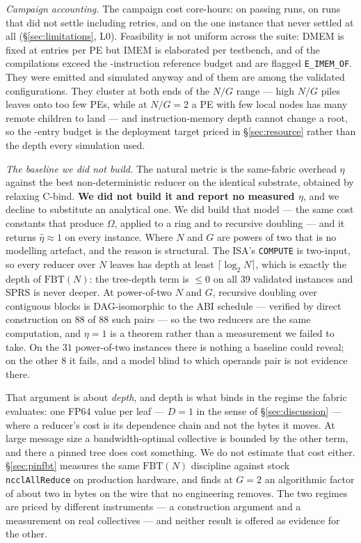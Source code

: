 \documentclass[journal,10pt]{IEEEtran}
\theoremstyle{plain}
\theoremstyle{definition}
\theoremstyle{remark}
\newcommand{\FBT}{\ensuremath{\mathrm{FBT}}}
\newcommand{\sprs}{\textsc{SPRS}}
\newcommand{\sv}[1]{\texttt{#1}}
\begin{document}
\emph{Campaign accounting.} The campaign cost \CampCoreHTotal{} core-hours:
\WallTotalH{} on passing runs, \CampCoreHUnsettled{} on runs that did not
settle including retries, and \MaxpCoreHours{} on the one instance that never
settled at all (\S\ref{sec:limitations}, L0). Feasibility
is not uniform across the suite: DMEM is fixed at \DmemDepth{} entries per PE
but IMEM is elaborated per testbench, and \ImemFlagged{} of the
\CompileTotal{} compilations exceed the \DmemDepth-instruction reference
budget and are flagged \sv{E\_IMEM\_OF}. They were emitted and simulated
anyway and \ImemFlaggedValidated{} of them are among the validated
configurations. They cluster at both ends of the $N/G$ range --- high $N/G$
piles leaves onto too few PEs, while at $N/G = 2$ a PE with few local nodes
has many remote children to land --- and instruction-memory depth cannot
change a root, so the \DmemDepth-entry budget is the deployment target priced
in \S\ref{sec:resource} rather than the depth every simulation used.

\emph{The baseline we did not build.} The natural metric is the same-fabric
overhead $\eta$ against the best non-deterministic reducer on the identical
substrate, obtained by relaxing \textsf{C-bind}. \textbf{We did not build it
and report no measured $\eta$}, and we decline to substitute an analytical
one. We did build that model --- the same cost constants that produce
$\Omega$, applied to a ring and to recursive doubling --- and it returns
$\hat\eta \approx 1$ on every instance. Where $N$ and $G$ are powers of two
that is no modelling artefact, and the reason is structural. The ISA's
\texttt{COMPUTE} is two-input, so every reducer over $N$ leaves has depth at
least $\lceil\log_2 N\rceil$, which is exactly the depth of $\FBT(N)$: the tree-depth term is $\le 0$ on all $39$
validated instances and \sprs{} is never deeper. At power-of-two $N$ and $G$,
recursive doubling over contiguous blocks is DAG-isomorphic to the ABI
schedule --- verified by direct construction on $88$ of $88$ such pairs --- so
the two reducers are the same computation, and $\eta = 1$ is a theorem rather
than a measurement we failed to take. On the $31$ power-of-two instances there
is nothing a baseline could reveal; on the other $8$ it fails, and a model
blind to which operands pair is not evidence there.

That argument is about \emph{depth}, and depth is what binds in the regime the
fabric evaluates: one FP64 value per leaf --- $D = 1$ in the sense of
\S\ref{sec:discussion} --- where a reducer's cost is its dependence chain and
not the bytes it moves. At large message size a bandwidth-optimal collective is
bounded by the other term, and there a pinned tree does cost something. We do
not estimate that cost either. \S\ref{sec:pinfbt} measures the same $\FBT(N)$
discipline against stock \texttt{ncclAllReduce} on production hardware, and
finds at $G{=}2$ an algorithmic factor of about two in bytes on the wire that
no engineering removes. The two regimes are priced by different instruments
--- a construction argument and a measurement on real collectives --- and neither
result is offered as evidence for the other.
\end{document}
